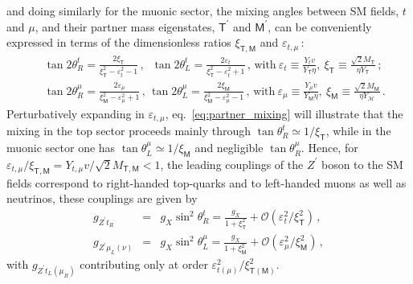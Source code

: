 and doing similarly for the muonic sector, the mixing angles between SM fields, $t$ and $\mu$,  and their partner mass eigenstates, $\mathsf{T}^{\prime}$ and $\mathsf{M}^{\prime}$, can be conveniently expressed in terms of the dimensionless ratios $\xi_{\mathsf{T,M}}$ and $\varepsilon_{t,\mu}\, $:
\begin{eqnarray}
	\label{eq:partner_mixing}
	& \  \tan 2 \theta_{R}^{t} = \frac{2 \xi_{\mathsf{T}}}{\xi_{\mathsf{T}}^2-\varepsilon_{t}^2-1} \, , \, 
	\ \, \tan 2 \theta_{L}^{t} = \frac{2 \varepsilon_{t}}{\xi_{\mathsf{T}}^2-\varepsilon_{t}^2 +1} \, , \,   \textrm{with} \ \varepsilon_{t} \equiv \frac{Y_{t} v}{Y_{\mathsf{T}} \eta},~\xi_{\mathsf{T}} \equiv \frac{\sqrt{2} M_{\mathsf{T}}}{\eta Y_{\mathsf{T}}} \, ; \ \\
	& \  \tan 2 \theta_{R}^{\mu} = \frac{2 \varepsilon_{\mu}}{\xi_{\mathsf{M}}^2-\varepsilon_{\mu}^2+1} \, , \, 
	\tan 2 \theta_{L}^{\mu} = \frac{2 \xi_{\mathsf{M}}}
	{\xi_{\mathsf{M}}^2-\varepsilon_{\mu}^2 -1}  \, , \, 
	\textrm{with} \ \varepsilon_{\mu} \equiv \frac{Y_{\mu} v}{Y_{\mathsf{M}} \eta},~\xi_{\mathsf{M}} \equiv \frac{\sqrt{2} M_{\mathsf{M}}}{\eta Y_{\mathcal{M}}} \, .
	\nonumber
\end{eqnarray}
Perturbatively expanding in $\varepsilon_{t,\mu}$, eq.~\eqref{eq:partner_mixing} will illustrate that the mixing in the top sector proceeds mainly through $\tan\theta^{t}_{R} \simeq 1/\xi_{\mathsf{T}}$, while in the muonic sector one has  $\tan\theta^{\mu}_{L} \simeq 1/\xi_{\mathsf{M}}$ and negligible $\tan\theta^{\mu}_{R}$.
Hence, for $\varepsilon_{t,\mu}/\xi_{\mathsf{T,M}}= Y_{t,\mu} v/\sqrt{2} M_{\mathsf{T,M}} < 1$, the leading couplings of the $Z^{\prime}$ boson to the SM fields correspond to right-handed top-quarks and to left-handed muons as well as neutrinos, these couplings are given by
\begin{eqnarray}
	\label{eq:Zprime_to_SM}
	g_{Z^{\prime} t_{R}} & = & g_{X} \sin^2 \theta_{R}^{t} = \frac{g_{X}}{ 1+ \xi^2_{\mathsf{T}}} + \mathcal{O}\left( \varepsilon_{t}^2/\xi_{\mathsf{T}}^2 \right) \, , \\
	g_{Z^{\prime} \mu_{L} (\nu)} & = &  g_{X} \sin^2 \theta_{L}^{\mu} = \frac{g_{X}}{1 + \xi^2_{\mathsf{M}}} 
	+ \mathcal{O}\left( \varepsilon_{\mu}^2 /\xi_{\mathsf{M}}^2 \right) \, ,
\end{eqnarray}
with $g_{Z^{\prime} t_{L} (\mu_{R})}$ contributing only at order $\varepsilon_{t  (\mu)}^2/\xi_{\mathsf{T(M)}}^2$.
